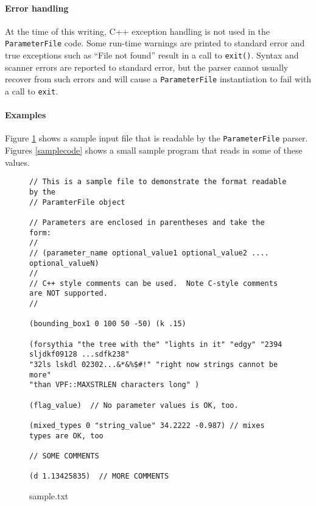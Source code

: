 \documentclass{article}
\newcommand{\code}[1]{\texttt{#1}}
\begin{document}
\paragraph{Error handling}
At the time of this writing, C++ exception handling is not used in the
\code{ParameterFile} code.  Some run-time warnings are printed to standard
error and true exceptions such as ``File not found'' result in a call to 
\code{exit()}.  Syntax and scanner errors are reported to standard error, but
the parser cannot usually recover from such errors and will cause a
\code{ParameterFile} instantiation to fail with a call to \code{exit}.



\paragraph{Examples}
Figure \ref{samplefile} shows a sample input file that is readable by the
\code{ParameterFile} parser.  Figures \ref{samplecode} shows a small sample
program that reads in some of these values.


\begin{figure}
\footnotesize
\begin{verbatim}
// This is a sample file to demonstrate the format readable by the
// ParamterFile object

// Parameters are enclosed in parentheses and take the form:
//
// (parameter_name optional_value1 optional_value2 .... optional_valueN)
//
// C++ style comments can be used.  Note C-style comments are NOT supported.
//

(bounding_box1 0 100 50 -50) (k .15)

(forsythia "the tree with the" "lights in it" "edgy" "2394 sljdkf09128 ...sdfk238"
"32ls lskdl 02302...&*&%$#!" "right now strings cannot be more"
"than VPF::MAXSTRLEN characters long" )

(flag_value)  // No parameter values is OK, too.

(mixed_types 0 "string_value" 34.2222 -0.987) // mixes types are OK, too

// SOME COMMENTS

(d 1.13425835)  // MORE COMMENTS
\end{verbatim}
\caption{sample.txt}
\label{samplefile}
\end{figure}
\end{document}
